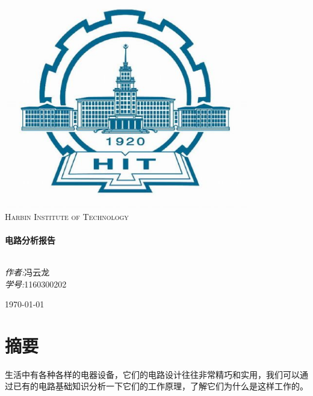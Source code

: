 \documentclass[a4paper,11pt]{ctexart}
\begin{document}
\begin{titlepage}
\begin{center}

\includegraphics[width=0.8\textwidth]{./images/HIT.eps}\\[1cm]
\textsc{\LARGE Harbin Institute of Technology}\\[1.5cm]

\hrulefill \\[0.4cm]
{ \huge \bfseries 电路分析报告}\\[0.4cm]
\hrulefill \\[1.5cm]

\begin{minipage}{0.4\textwidth}
\begin{flushleft} \large
\end{flushleft}
\end{minipage}

\begin{minipage}{\textwidth}
\begin{flushright} \large
\emph{作者:}冯云龙\\
\emph{学号:}1160300202
\end{flushright}
\end{minipage}

\vfill
{\large \today}%
\end{center}
\end{titlepage}

\part*{摘要}生活中有各种各样的电器设备，它们的电路设计往往非常精巧和实用，我们可以通过已有的电路基础知识分析一下它们的工作原理，了解它们为什么是这样工作的。
\end{document}
